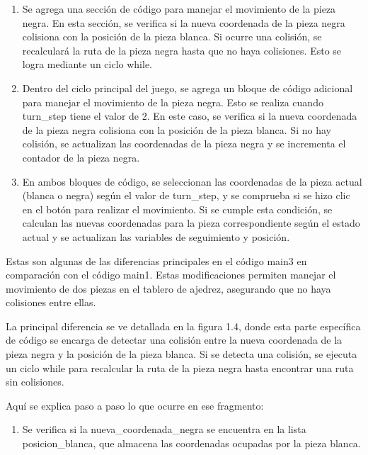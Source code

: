 \begin{enumerate}
\begin{enumerate}
    \item Se agrega una sección de código para manejar el movimiento de la pieza negra. En esta sección, se verifica si la nueva coordenada de la pieza negra colisiona con la posición de la pieza blanca. Si ocurre una colisión, se recalculará la ruta de la pieza negra hasta que no haya colisiones. Esto se logra mediante un ciclo while.\newline
    
    \item Dentro del ciclo principal del juego, se agrega un bloque de código adicional para manejar el movimiento de la pieza negra. Esto se realiza cuando turn\_step tiene el valor de 2. En este caso, se verifica si la nueva coordenada de la pieza negra colisiona con la posición de la pieza blanca. Si no hay colisión, se actualizan las coordenadas de la pieza negra y se incrementa el contador de la pieza negra.\newline
    
    \item En ambos bloques de código, se seleccionan las coordenadas de la pieza actual (blanca o negra) según el valor de turn\_step, y se comprueba si se hizo clic en el botón para realizar el movimiento. Si se cumple esta condición, se calculan las nuevas coordenadas para la pieza correspondiente según el estado actual y se actualizan las variables de seguimiento y posición.\newline
\end{enumerate}


Estas son algunas de las diferencias principales en el código main3 en comparación con el código main1. Estas modificaciones permiten manejar el movimiento de dos piezas en el tablero de ajedrez, asegurando que no haya colisiones entre ellas.\newline

La principal diferencia se ve detallada en la figura 1.4, donde esta parte específica de código se encarga de detectar una colisión entre la nueva coordenada de la pieza negra y la posición de la pieza blanca. Si se detecta una colisión, se ejecuta un ciclo while para recalcular la ruta de la pieza negra hasta encontrar una ruta sin colisiones.\newline

Aquí se explica paso a paso lo que ocurre en ese fragmento:\newline
\begin{enumerate}
    \item Se verifica si la nueva\_coordenada\_negra se encuentra en la lista posicion\_blanca, que almacena las coordenadas ocupadas por la pieza blanca.\newline


\end{enumerate}
\end{enumerate}

